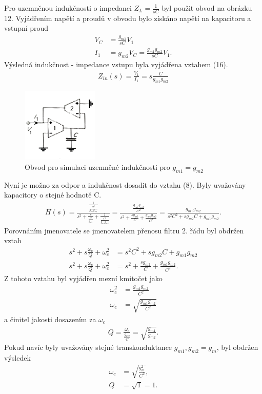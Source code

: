 \documentclass[twoside]{article}
\begin{document}
\noindent Pro uzemněnou indukčnosti o impedanci $Z_L = \frac{1}{sC}$ byl použit obvod na obrázku 12. Vyjádřením napětí a proudů v obvodu bylo získáno napětí na kapacitoru a vstupní proud
\begin{align}
V_C &= \frac{g_{m1}}{sC}V_1 \\
I_1 &= g_{m2}V_C = \frac{g_{m1}g_{m2}}{sC}V_1.
\end{align}
Výsledná indukčnost - impedance vstupu byla vyjádřena vztahem (16).
\begin{align}
Z_{in}(s) = \frac{V_1}{I_1} = s\frac{C}{g_{m1}g_{m2}}
\end{align}
\begin{figure}[H]
\centering
\includegraphics[scale=1]{image12.png}
\caption{Obvod pro simulaci uzemněné indukčnosti pro $g_{m1} = g_{m2}$\cite{8}}
\end{figure}
\noindent Nyní je možno za odpor a indukčnost dosadit do vztahu (8). Byly uvažovány kapacitory o stejné hodnotě C.
\begin{align}
H(s) = \frac{\frac{1}{\frac{C^2}{g_{m1}g_{m2}}}}{s^2 + \frac{s}{\frac{C}{g_{m2}}} + \frac{1}{\frac{C^2}{g_{m1}g_{m2}}}} = \frac{\frac{g_{m1}g_{m2}}{C^2}}{s^2 + \frac{sg_{m2}}{C} + \frac{g_{m1}g_{m2}}{C^2}} = \frac{g_{m1}g_{m2}}{s^2C^2 + sg_{m2}C + g_{m1}g_{m2}}.
\end{align}
Porovnáním jmenovatele se jmenovatelem přenosu filtru 2. řádu byl obdržen vztah
\begin{align}
s^2 + s\frac{\omega _c}{Q} + \omega _c^2 &= s^2C^2 + sg_{m2}C + g_{m1}g_{m2}\\
s^2 + s\frac{\omega _c}{Q} + \omega _c^2 &= s^2 + \frac{sg_{m2}}{C} + \frac{g_{m1}g_{m2}}{C^2}.
\end{align}
Z tohoto vztahu byl vyjádřen mezní kmitočet jako 
\begin{align}
\omega _c^2 &= \frac{g_{m1}g_{m2}}{C^2} \\
\omega _c &= \sqrt{\frac{g_{m1}g_{m2}}{C^2}}
\end{align}
a činitel jakosti dosazením za $\omega _c$
\begin{align}
Q = \frac{\omega _c}{\frac{g_{m2}}{C}} = \sqrt{\frac{g_{m1}}{g_{m2}}}.
\end{align}
Pokud navíc byly uvažovány stejné transkonduktance $g_{m1},g_{m2} = g_m$, byl obdržen výsledek
\begin{align}
\omega _c &= \sqrt{\frac{g_m^2}{C^2}},\\
Q &= \sqrt{1} = 1.
\end{align}
\end{document}
